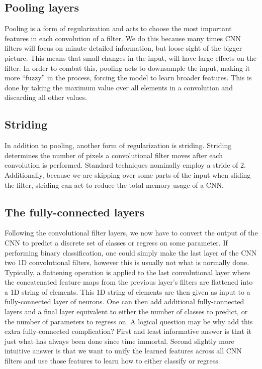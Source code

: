 \subsection{Pooling layers}
Pooling is a form of regularization and acts to choose 
the most important features in each convolution of a filter. 
We do this because many times \ac{CNN} filters will focus 
on minute detailed information, but loose sight of the 
bigger picture. This means that small changes in the 
input, will have large effects on the filter. In order to 
combat this, pooling acts to downsample the input, making 
it more ``fuzzy'' in the process, forcing the model 
to learn broader features.
This is done by taking the maximum value over all elements 
in a convolution and discarding all other values. 

\subsection{Striding}
In addition to pooling, another form of regularization is 
striding. Striding determines the number of pixels a 
convolutional filter moves after each convolution 
is performed. Standard techniques nominally employ 
a stride of 2. Additionally, because we are skipping 
over some parts of the input when sliding the filter, 
striding can act to reduce the total memory usage of a 
\ac{CNN}.

\subsection{The fully-connected layers}

Following the convolutional filter layers, we now 
have to convert the output of the CNN to predict 
a discrete set of classes or regress on some parameter. 
If performing binary classification, one could simply 
make the last layer of the \ac{CNN} two 1D convolutional 
filters, however this is usually not what is normally 
done. Typically, a flattening operation is applied 
to the last convolutional layer where the concatenated 
feature maps from the previous layer's filters 
are flattened into a 1D string of elements. This 1D 
string of elements are then given as input to 
a fully-connected layer of neurons. One can then add 
additional fully-connected layers and a final 
layer equivalent to either the number of classes to 
predict, or the number of parameters to regress on. 
A logical question may be why add this extra 
fully-connected complication? First and least 
informative answer is that it just what has 
always been done since time immortal. Second 
slightly more intuitive answer is that we want 
to unify the learned features across all 
\ac{CNN} filters and use those features to learn 
how to either classify or regress.


